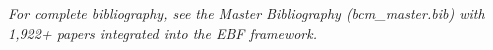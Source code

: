 \textit{For complete bibliography, see the Master Bibliography (bcm\_master.bib)
with 1,922+ papers integrated into the EBF framework.}

